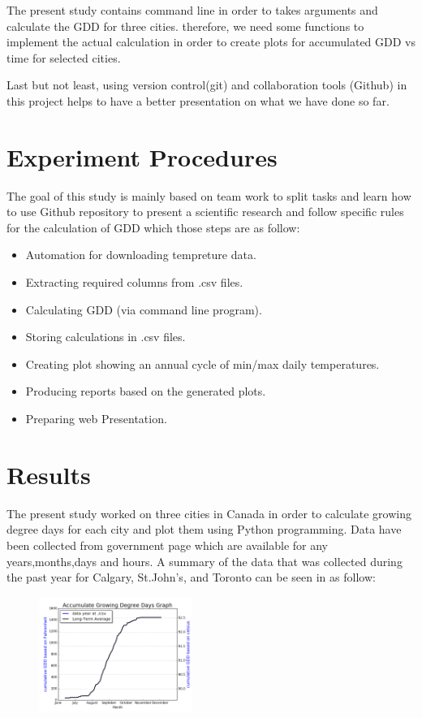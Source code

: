 \documentclass[DIV=calc, paper=a4, fontsize=11pt, twocolumn]{scrartcl}
\begin{document}
The present study contains command line in order to takes arguments and calculate the GDD for three cities. therefore, we need some functions to implement the actual calculation in order to create plots for accumulated GDD vs time for selected cities.

Last but not least, using version control(git) and collaboration tools (Github) in this project helps to have a better presentation on what we have done so far.


\section{Experiment Procedures}
The goal of this study is mainly based on team work to split tasks and learn how to use Github repository to present a scientific research and follow specific rules for the calculation of GDD which those steps are as follow:

\begin{itemize}
\item Automation for downloading tempreture data.
\item Extracting required columns from .csv files.
\item Calculating GDD (via command line program).
\item Storing calculations in .csv files.
\item Creating plot showing an annual cycle of min/max daily temperatures.
\item Producing reports based on the generated plots.
\item Preparing web Presentation.
\end{itemize}
\section{Results}
The present study worked on three cities in Canada in order to calculate growing degree days for each city and plot them using Python programming. Data have been collected from government page which are available for any years,months,days and hours. 
A summary of the data that was collected during the past year for Calgary, St.John's, and Toronto can be seen in as follow:
\begin{figure}[h!]
	\centering
	\includegraphics[width=50mm]{../output/27211_2015_gdd.png}

	\label{fig:method7}
\end{figure}
\end{document}
